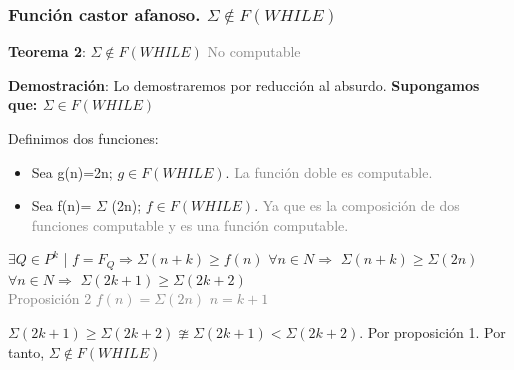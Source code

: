 \documentclass[xcolor=table]{beamer}
\begin{document}
\begin{frame}[fragile]\frametitle{Función castor afanoso. $\Sigma \notin  F(WHILE)$} \scriptsize

\textbf{Teorema 2}: $\Sigma \notin  F(WHILE)$ \textcolor{gray}{No computable} 

\hspace{1cm}

\textbf{Demostración}: Lo demostraremos por reducción al absurdo.
\textbf{Supongamos que: $\Sigma \in F(WHILE)$}

Definimos dos funciones: \\
\begin{itemize}
    \item Sea g(n)=2n; $g \in F(WHILE)$. \textcolor{gray}{La función doble es computable.}\\
    \item Sea f(n)= $\Sigma$ (2n); $f \in F(WHILE)$. \textcolor{gray}{Ya que es la composición de dos funciones computable y es una función computable. }
\end{itemize}
\hspace{0.3cm}

 $\exists Q \in P^k$ | $f = F_Q \Rightarrow \Sigma (n+k) \geq f(n)$  $\forall n \in N \Rightarrow$
 $\Sigma (n+k) \geq \Sigma(2n)$  $\forall n \in N \Rightarrow$  $\Sigma (2k+1) \geq \Sigma(2k+2) $\hfill\break\\
 \textcolor{gray}{ \hspace{15mm} Proposición 2  \hspace{17mm}  $f(n) = \Sigma(2n)$ \hspace{20mm} $n=k+1$}  \hfill\break
   
 $\Sigma(2k+1) \geq \Sigma(2k+2) \ncong \Sigma(2k+1) < \Sigma(2k+2)$. Por proposición 1. Por tanto, $\Sigma \notin  F(WHILE)$ 
\end{frame}
\end{document}
